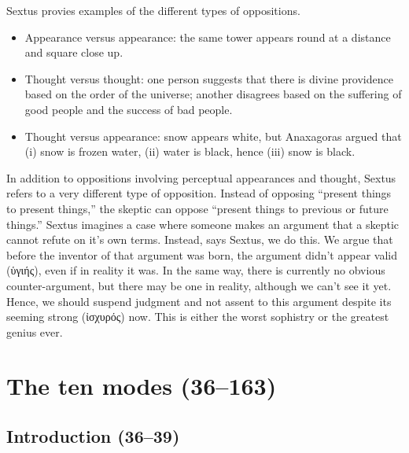 Sextus provies examples of the different types of oppositions.
\begin{itemize}
    \item Appearance versus appearance: the same tower appears round at a distance and square close up.
    \item Thought versus thought: one person suggests that there is divine providence based on the order of the universe; another disagrees based on the suffering of good people and the success of bad people.
    \item Thought versus appearance: snow appears white, but Anaxagoras argued that (i) snow is frozen water, (ii) water is black, hence (iii) snow is black.
\end{itemize}

In addition to oppositions involving perceptual appearances and thought, Sextus refers to a very different type of opposition. Instead of opposing ``present things to present things,'' the skeptic can oppose ``present things to previous or future things.'' Sextus imagines a case where someone makes an argument that a skeptic cannot refute on it's own terms. Instead, says Sextus, we do this. We argue that before the inventor of that argument was born, the argument didn't appear valid (\textgreek{ὑγιής}), even if in reality it was. In the same way, there is currently no obvious counter-argument, but there may be one in reality, although we can't see it yet. Hence, we should suspend judgment and not assent to this argument despite its seeming strong (\textgreek{ἰσχυρός}) now. This is either the worst sophistry or the greatest genius ever.\autocite{striker2001}

\section{The ten modes (36--163)}

\subsection{Introduction (36--39)\autocite[][Chapter 3]{annasbarnesmodes1985}}

